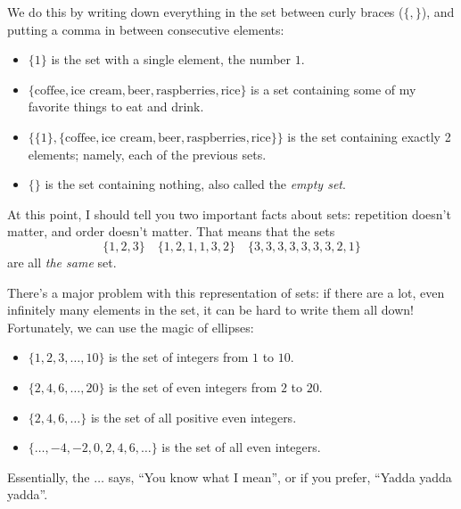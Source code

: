 \documentclass{tufte-book}
\begin{document}
We do this by writing down everything in the set between curly braces ($\{, \}$), and putting a comma in between consecutive elements:
\begin{itemize}
    \item $\{1\}$ is the set with a single element, the number $1$.
    \item $\{\text{coffee}, \text{ice cream}, \text{beer}, \text{raspberries}, \text{rice}\}$ is a set containing some of my favorite things to eat and drink.
    \item $\{\{1\}, \{\text{coffee}, \text{ice cream}, \text{beer}, \text{raspberries}, \text{rice}\}\}$ is the set containing exactly 2 elements; namely, each of the previous sets.
    \item $\{\}$ is the set containing nothing, also called the \emph{empty set}.
\end{itemize}
At this point, I should tell you two important facts about sets: repetition doesn't matter, and order doesn't matter. That means that the sets
\[
\{1, 2, 3\} \quad \{1, 2, 1, 1, 3, 2\} \quad \{3, 3, 3, 3, 3, 3, 3, 2, 1\}
\]
are all \emph{the same} set. 

There's a major problem with this representation of sets: if there are a lot, even infinitely many elements in the set, it can be hard to write them all down! Fortunately, we can use the magic of ellipses:
\begin{itemize}
    \item $\{1, 2, 3, \dots, 10\}$ is the set of integers from $1$ to $10$.
    \item $\{2, 4, 6, \dots, 20\}$ is the set of even integers from $2$ to $20$.
    \item $\{2, 4, 6, \dots\}$ is the set of all positive even integers.
    \item $\{\dots, -4, -2, 0, 2, 4, 6, \dots\}$ is the set of all even integers.
\end{itemize}
Essentially, the $\dots$ says, ``You know what I mean'', or if you prefer, ``Yadda yadda yadda''.
\end{document}

